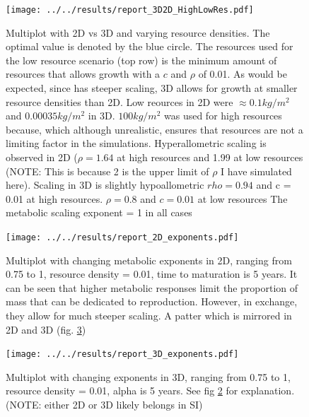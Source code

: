 \documentclass[a4paper, 11pt, hidelinks]{article} %
\begin{document}
	\begin{figure}[h!]
		
		
		
		\texttt{[image: ../../results/report\_3D2D\_HighLowRes.pdf]}
		
		\caption{Multiplot with 2D vs 3D and varying resource densities. The optimal value is denoted by the blue circle.
		The resources used for the low resource scenario (top row) is the minimum amount of resources that allows growth with a $c$ and $\rho$ of 0.01.  As would be expected, since has steeper scaling, 3D allows for growth at smaller resource densities than 2D.
		Low reources in 2D were $ \approx 0.1kg/m^2 $ and $ 0.00035kg/m^2 $ in 3D.
		$ 100kg/m^2 $ was used for high resources because, which although unrealistic, ensures that resources are not a limiting factor in the simulations.
		Hyperallometric scaling is observed in 2D ($\rho = 1.64$ at high resources and 1.99 at low resources (NOTE: This is because 2 is the upper limit of $\rho$ I have simulated here). 
		Scaling in 3D is slightly hypoallometric $rho = 0.94$ and c = 0.01 at high resources. $\rho = 0.8$ and $c = 0.01$ at low resources
		The metabolic scaling exponent = 1 in all cases}
		\label{resources2D3D}
	\end{figure}
	
	
	\begin{figure}[h!]
		
		\texttt{[image: ../../results/report\_2D\_exponents.pdf]}
		
		\caption{Multiplot with changing metabolic exponents in 2D, ranging from 0.75 to 1, resource density = 0.01, time to maturation is 5 years.  
		It can be seen that higher metabolic responses limit the proportion of mass that can be dedicated to reproduction.  However, in exchange, they allow for much steeper scaling.  A patter which is mirrored in 2D and 3D (fig. \ref{exponents3D})}
		\label{exponents2D}
	\end{figure}
		
		\begin{figure}[h!]
		
		
		
		\texttt{[image: ../../results/report\_3D\_exponents.pdf]}
		
		\caption{Multiplot with changing exponents in 3D, ranging from 0.75 to 1, resource density = 0.01, alpha is 5 years. See fig \ref{exponents2D} for explanation. (NOTE: either 2D or 3D likely belongs in SI) } %
		\label{exponents3D}
	\end{figure}
		
\end{document}
